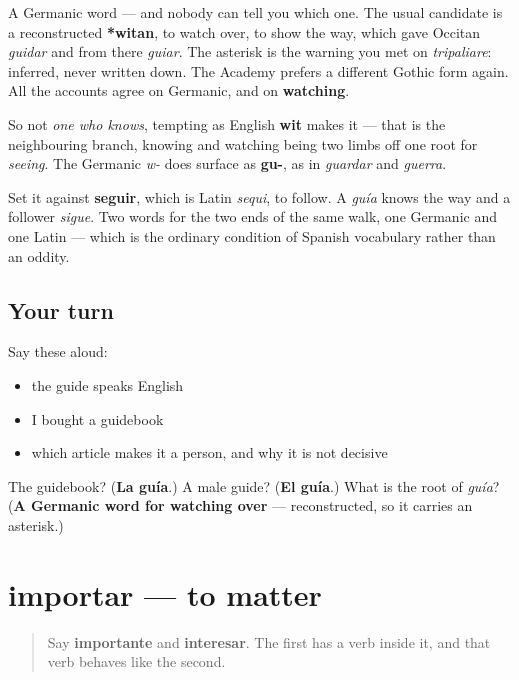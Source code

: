 \begin{cousinweb}
A Germanic word — and nobody can tell you which one. The usual candidate is a reconstructed \textbf{*witan}, to watch over, to show the way, which gave Occitan \emph{guidar} and from there \emph{guiar}. The asterisk is the warning you met on \emph{tripaliare}: inferred, never written down. The Academy prefers a different Gothic form again. All the accounts agree on Germanic, and on \textbf{watching}.

So not \emph{one who knows}, tempting as English \textbf{wit} makes it — that is the neighbouring branch, knowing and watching being two limbs off one root for \emph{seeing}. The Germanic \emph{w-} does surface as \textbf{gu-}, as in \emph{guardar} and \emph{guerra}.

Set it against \textbf{seguir}, which is Latin \emph{sequi}, to follow. A \emph{guía} knows the way and a follower \emph{sigue}. Two words for the two ends of the same walk, one Germanic and one Latin — which is the ordinary condition of Spanish vocabulary rather than an oddity.
\end{cousinweb}

\subsection*{Your turn}
Say these aloud:

\begin{itemize}
\raggedright
  \item the guide speaks English
  \item I bought a guidebook
  \item which article makes it a person, and why it is not decisive
\end{itemize}

\begin{tcolorbox}[breakable,colback=teal!4,colframe=teal!35!black,title={Before you move on}]
The guidebook? (\textbf{La guía}.) A male guide? (\textbf{El guía}.) What is the root of \emph{guía}? (\textbf{A Germanic word for watching over} — reconstructed, so it carries an asterisk.)
\end{tcolorbox}
\section[importar]{importar — to matter}

\label{lesson:ES-C463-importar}



\begin{quote}
Say \textbf{importante} and \textbf{interesar}. The first has a verb inside it, and that verb behaves like the second.
\end{quote}


